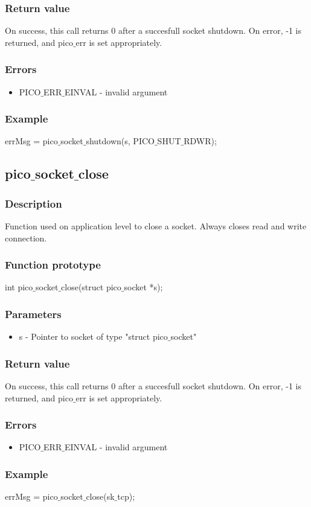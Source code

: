 \subsubsection*{Return value}
On success, this call returns 0 after a succesfull socket shutdown.
On error, -1 is returned, and pico$\_$err is set appropriately.

\subsubsection*{Errors}
\begin{itemize}
\item PICO$\_$ERR$\_$EINVAL - invalid argument
\end{itemize}

\subsubsection*{Example}
errMsg = pico$\_$socket$\_$shutdown(s, PICO$\_$SHUT$\_$RDWR);


\subsection{pico$\_$socket$\_$close}

\subsubsection*{Description}
Function used on application level to close a socket. Always closes read and write connection.

\subsubsection*{Function prototype}
int pico$\_$socket$\_$close(struct pico$\_$socket *s);

\subsubsection*{Parameters}
\begin{itemize}
\item s - Pointer to socket of type "struct pico$\_$socket"
\end{itemize}

\subsubsection*{Return value}
On success, this call returns 0 after a succesfull socket shutdown.
On error, -1 is returned, and pico$\_$err is set appropriately.

\subsubsection*{Errors}
\begin{itemize}
\item PICO$\_$ERR$\_$EINVAL - invalid argument
\end{itemize}

\subsubsection*{Example}
errMsg = pico$\_$socket$\_$close(sk$\_$tcp);